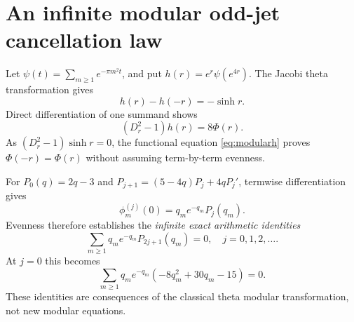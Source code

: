\section{An infinite modular odd-jet cancellation law}
\label{sec:modularoddjets}
Let $\psi(t)=\sum_{m\ge1}e^{-\pi m^2t}$,
and put $h(r)=e^r\psi(e^{4r})$.
The Jacobi theta transformation gives
\begin{equation}
h(r)-h(-r)=-\sinh r.
\label{eq:modularh}
\end{equation}
Direct differentiation of one summand shows
\[
(D_r^2-1)h(r)=8\Phi(r).
\]
As $(D_r^2-1)\sinh r=0$,
the functional equation \eqref{eq:modularh}
proves $\Phi(-r)=\Phi(r)$ without assuming
term-by-term evenness.

For $P_0(q)=2q-3$ and
$P_{j+1}=(5-4q)P_j+4qP_j'$,
termwise differentiation gives
\[
\phi_m^{(j)}(0)=q_me^{-q_m}P_j(q_m).
\]
Evenness therefore establishes the
\emph{infinite exact arithmetic identities}
\begin{equation}
\boxed{\sum_{m\ge1}
q_me^{-q_m}P_{2j+1}(q_m)=0,
\quad j=0,1,2,\ldots.}
\label{eq:oddjetidentity}
\end{equation}
At $j=0$ this becomes
\begin{equation}
\boxed{
\sum_{m\ge1}q_me^{-q_m}
(-8q_m^2+30q_m-15)=0.}
\label{eq:firstmodularcancellation}
\end{equation}
These identities are consequences of
the classical theta modular transformation,
not new modular equations.

